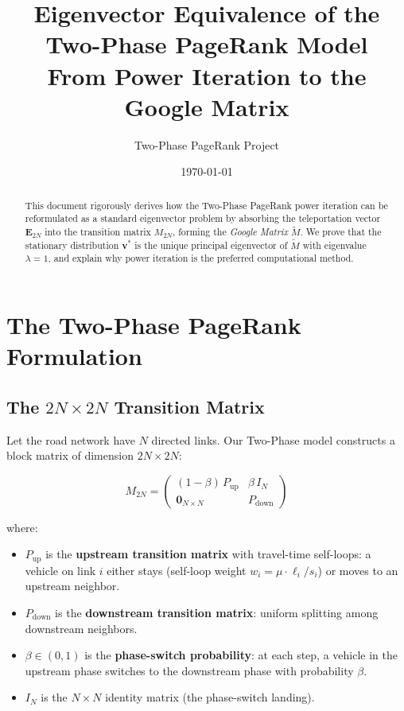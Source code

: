 \documentclass[11pt,a4paper]{article}
\title{\textbf{Eigenvector Equivalence of the\\Two-Phase PageRank Model}\\[6pt]
\large From Power Iteration to the Google Matrix}
\author{Two-Phase PageRank Project}
\date{\today}
\theoremstyle{definition}
\begin{document}
\maketitle

\begin{abstract}
This document rigorously derives how the Two-Phase PageRank power iteration
can be reformulated as a standard eigenvector problem by absorbing the
teleportation vector $\bm{E}_{2N}$ into the transition matrix $M_{2N}$,
forming the \emph{Google Matrix} $\widetilde{M}$.  We prove that the
stationary distribution $\bm{v}^*$ is the unique principal eigenvector of
$\widetilde{M}$ with eigenvalue $\lambda=1$, and explain why power iteration
is the preferred computational method.
\end{abstract}

\tableofcontents
\vspace{1em}

\section{The Two-Phase PageRank Formulation}

\subsection{\texorpdfstring{The $2N \times 2N$ Transition Matrix}{The 2N x 2N Transition Matrix}}

Let the road network have $N$ directed links.  Our Two-Phase model constructs
a block matrix of dimension $2N \times 2N$:

\begin{equation}\label{eq:M2N}
M_{2N} =
\begin{pmatrix}
(1-\beta)\,P_{\text{up}} & \beta\,I_N \\[4pt]
\bm{0}_{N\times N} & P_{\text{down}}
\end{pmatrix}
\end{equation}

where:
\begin{itemize}
  \item $P_{\text{up}}$ is the \textbf{upstream transition matrix} with
        travel-time self-loops: a vehicle on link $i$ either stays
        (self-loop weight $w_i = \mu \cdot \ell_i / s_i$) or moves to an
        upstream neighbor.
  \item $P_{\text{down}}$ is the \textbf{downstream transition matrix}:
        uniform splitting among downstream neighbors.
  \item $\beta \in (0,1)$ is the \textbf{phase-switch probability}: at each
        step, a vehicle in the upstream phase switches to the downstream
        phase with probability $\beta$.
  \item $I_N$ is the $N \times N$ identity matrix (the phase-switch landing).
\end{itemize}
\end{document}
